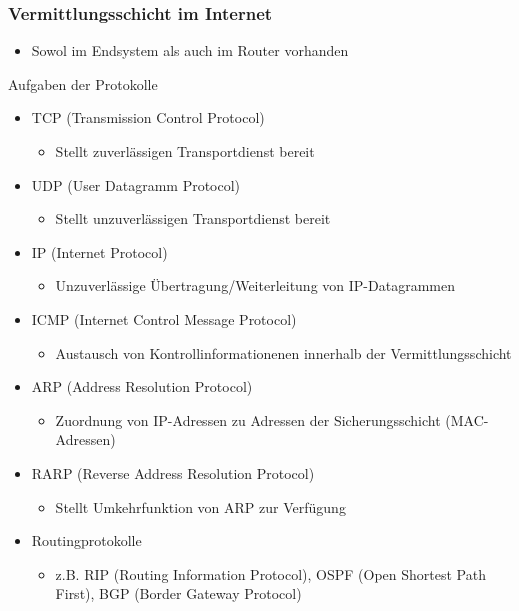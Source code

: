    \subsubsection{Vermittlungsschicht im Internet}
      \begin{itemize}
        \item Sowol im Endsystem als auch im Router vorhanden
      \end{itemize}
      Aufgaben der Protokolle
      \begin{itemize}
        \item TCP (Transmission Control Protocol)
          \begin{itemize}
            \item Stellt zuverlässigen Transportdienst bereit
          \end{itemize}
        \item UDP (User Datagramm Protocol)
          \begin{itemize}
            \item Stellt unzuverlässigen Transportdienst bereit
          \end{itemize}
        \item IP (Internet Protocol)
          \begin{itemize}
            \item Unzuverlässige Übertragung/Weiterleitung von IP-Datagrammen
          \end{itemize}
        \item ICMP (Internet Control Message Protocol)
          \begin{itemize}
            \item Austausch von Kontrollinformationenen innerhalb der Vermittlungsschicht
          \end{itemize}
        \item ARP (Address Resolution Protocol)
          \begin{itemize}
            \item Zuordnung von IP-Adressen zu Adressen der Sicherungsschicht (MAC-Adressen)
          \end{itemize}
        \item RARP (Reverse Address Resolution Protocol)
          \begin{itemize}
            \item Stellt Umkehrfunktion von ARP zur Verfügung
          \end{itemize}
        \item Routingprotokolle
          \begin{itemize}
            \item z.B. RIP (Routing Information Protocol), OSPF (Open Shortest Path First), BGP
              (Border Gateway Protocol)
          \end{itemize}
      \end{itemize}
